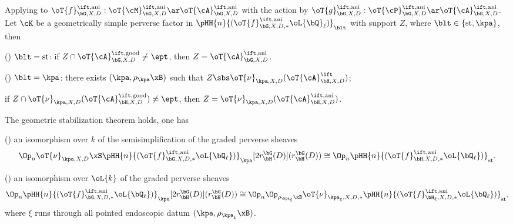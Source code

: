 \documentclass[article, a4paper, twoside]{universal}
\begin{document}
\begin{thm}
	Applying to $\oT{f}_{\bG,X,D}^{\ift,\text{ani}}:\oT{\cM}_{\bG,X,D}^{\ift,\text{ani}}\ar\oT{\cA}_{\bG,X,D}^{\ift,\text{ani}}$ with the action by $\oT{g}_{\bG,X,D}^{\ift,\text{ani}}:\oT{\cP}_{\bG,X,D}^{\ift,\text{ani}}\ar\oT{\cA}_{\bG,X,D}^{\ift,\text{ani}}$. Let $\cK$ be a geometrically simple perverse factor in $\pHH{n}{(\oT{f}_{\bG,X,D,*}^{\ift,\text{ani}}\oL{\bQ}_{\ell})}_{\blt}$ with support $Z$, where $\blt\in\{\text{st},\kpa\}$, then
	\begin{enr}[label=(\arabic*)]
		\item (\cite[Theorem~7.8.3]{Ngo2010Lemme}) $\blt=\text{st}$: if $Z\cap\oT{\cA}_{\bG,X,D}^{\ift,\text{good}}\neq\ept$, then $Z=\oT{\cA}_{\bG,X,D}^{\ift,\text{ani}}$.
		\item (\cite[Theorem~7.8.5]{Ngo2010Lemme}) $\blt=\kpa$: there exists $(\kpa,\rho_{\kpa}\xB)$ such that $Z\sbs\oT{\nu}_{\kpa,X,D}(\oT{\cA}_{\bH,X,D}^{\ift})$;

		if $Z\cap\oT{\nu}_{\kpa,X,D}(\oT{\cA}_{\bH,X,D}^{\ift,\text{good}})\neq\ept$, then $Z=\oT{\nu}_{\kpa,X,D}(\oT{\cA}_{\bH,X,D}^{\ift,\text{ani}})$.
	\end{enr}
\end{thm}



\begin{thm}
	The geometric stabilization theorem holds, one has
	\begin{itm}
		\item (\cite[Theorem~6.4.2]{Ngo2010Lemme}) an isomorphism over $k$ of the semisimplification of the graded perverse sheaves
	\[
	  \Op_{n}\oT{\nu}_{\kpa,X,D}\xS \pHH{n}{(\oT{f}^{\ift,\text{ani}}_{\bG,X,D,*}\oL{\bQ_{\ell}})}_{\kpa}[2r_{\bH}^{\bG}(D)](r_{\bH}^{\bG}(D))\cong\Op_{n}\pHH{n}{(\oT{f}^{\ift,\text{ani}}_{\bH,X,D,*}\oL{\bQ_{\ell}})}_{\text{st}}.
  	\]
		\item (\cite[Theorem~6.4.1]{Ngo2010Lemme}) an isomorphism over $\oL{k}$ of the graded perverse sheaves
	\[
		\Op_{n}\pHH{n}{(\oT{f}^{\ift,\text{ani}}_{\bG,X,D,*}\oL{\bQ_{\ell}})}_{\kpa}[2r_{\bH}^{\bG}(D)](r_{\bH}^{\bG}(D))\cong\Op_{n}\Op_{\rho_{\kpa_{\xi}}\xB}\oT{\nu}_{\kpa_{\xi},X,D,*}\pHH{n}{(\oT{f}^{\ift,\text{ani}}_{\bH_{\xi},X,D,*}\oL{\bQ_{\ell}})}_{\text{st}},
	\]
	where $\xi$ runs through all pointed endoscopic datum $(\kpa,\rho_{\kpa_{\xi}}\xB)$.
	\end{itm}
\end{thm}
\end{document}
